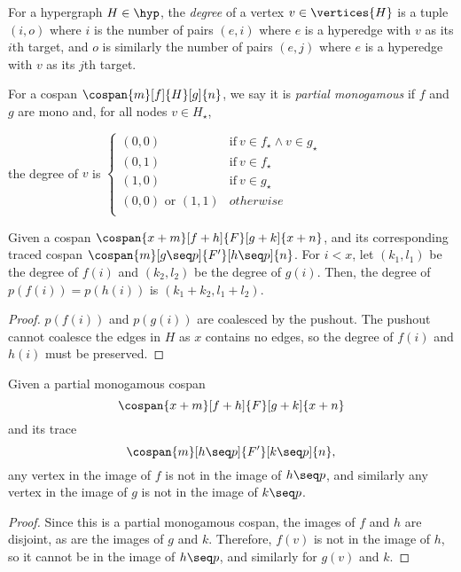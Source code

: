 \begin{definition}
    For a hypergraph \(H \in \hyp\), the \emph{degree} of a vertex \(v \in \vertices{H}\) is a tuple \((i,o)\) where \(i\) is the number of pairs \((e,i)\) where \(e\) is a hyperedge with \(v\) as its \(i\)th target, and \(o\) is similarly the number of pairs \((e,j)\) where \(e\) is a hyperedge with \(v\) as its \(j\)th target.
\end{definition}

\begin{definition}
    For a cospan \(\cospan{m}[f]{H}[g]{n}\), we say it is \emph{partial monogamous} if \(f\) and \(g\) are mono and, for all nodes \(v \in H_\star\),
    \begin{center}
        the degree of \(v\) is $\begin{cases}
            (0,0) & \text{if}\ v \in f_\star \wedge v \in g_\star \\
            (0,1) & \text{if}\ v \in f_\star \\
            (1,0) & \text{if}\ v \in g_\star \\
            (0,0) \text{ or } (1,1) & otherwise \\
        \end{cases}$
    \end{center}
\end{definition}

\begin{lemma}\label{lem:trace-degree}
    Given a cospan \(\cospan{x+m}[f+h]{F}[g+k]{x+n}\), and its corresponding traced cospan \(\cospan{m}[g \seq p]{F^\prime}[h \seq p]{n}\).
    For \(i < x\), let \((k_1,l_1)\) be the degree of \(f(i)\) and \((k_2,l_2)\) be the degree of \(g(i)\).
    Then, the degree of \(p(f(i)) = p(h(i))\) is \((k_1 + k_2, l_1 + l_2)\).
\end{lemma}
\begin{proof}
    \(p(f(i))\) and \(p(g(i))\) are coalesced by the pushout.
    The pushout cannot coalesce the edges in \(H\) as \(x\) contains no edges, so the degree of \(f(i)\) and \(h(i)\) must be preserved.
\end{proof}

\begin{lemma}\label{lem:trace-interface}
    Given a partial monogamous cospan \[\cospan{x+m}[f+h]{F}[g+k]{x+n}\] and its trace \[\cospan{m}[h \seq p]{F^\prime}[k \seq p]{n},\] any vertex in the image of \(f\) is not in the image of \(h \seq p\), and similarly any vertex in the image of \(g\) is not in the image of \(k \seq p\).
\end{lemma}
\begin{proof}
    Since this is a partial monogamous cospan, the images of \(f\) and \(h\) are disjoint, as are the images of \(g\) and \(k\).
    Therefore, \(f(v)\) is not in the image of \(h\), so it cannot be in the image of \(h \seq p\), and similarly for \(g(v)\) and \(k\).
\end{proof}

